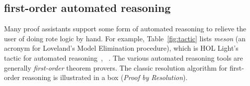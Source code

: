 \documentclass{llncs}
\begin{document}
\subsection{first-order automated reasoning}

Many proof assistants support some form of automated reasoning to
relieve the user of doing rote logic by hand. For example, Table~\ref{fig:tactic}
lists {\it meson} (an acronym for Loveland's Model Elimination
procedure), which is HOL Light's tactic for automated reasoning~\cite[Sec.~3.15]{Ha09},
~\cite{harrison:meson}.
The various automated reasoning tools are generally {\it first-order}
theorem provers.  The classic resolution algorithm for first-order
reasoning is illustrated in a box ({\it Proof by Resolution}).

\newpage
\bigskip
\noindent
\end{document}
